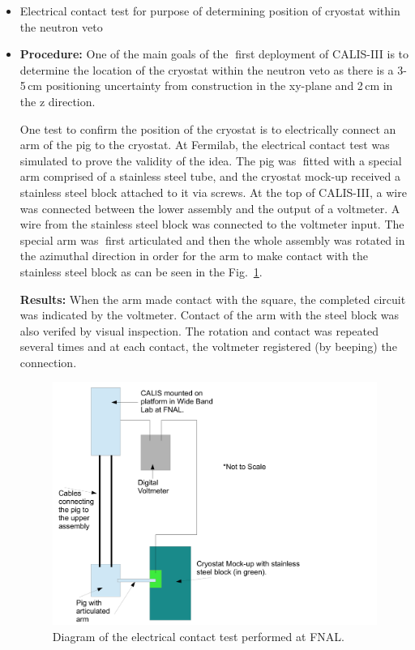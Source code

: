 \begin{itemize}
 \item{Electrical contact test for purpose of determining position of cryostat within the neutron veto}
  
\item{\bf Procedure:} One of the main goals of the first deployment of CALIS-III is to determine the location of the cryostat within the neutron veto as there is a 3-5\,cm positioning uncertainty from construction in the xy-plane and 2\,cm in the z direction.

One test to confirm the position of the cryostat is to electrically connect an arm of the pig to the cryostat. At Fermilab, the electrical contact test was simulated to prove the validity of the idea. The pig was fitted
with a special arm comprised of a stainless steel tube, and the cryostat mock-up received a stainless steel
block attached to it via screws. At the top of CALIS-III, a wire was connected between the lower assembly
and the output of a voltmeter. A wire from the stainless steel block was connected to the voltmeter input. The special arm was first articulated and then the whole assembly was rotated in the azimuthal direction in
order for the arm to make contact with the stainless steel block as can be seen in the Fig.~\ref{fig:electricalContact}.

{\bf Results:} When the arm made contact with the square, the completed circuit was indicated by the
voltmeter. Contact of the arm with the steel block was also verifed by visual inspection. The rotation and
contact was repeated several times and at each contact, the voltmeter registered (by beeping) the connection.

\begin{figure}[htbp]
 \centering
 \includegraphics[width=7in]{Figures/electricalContact_FNALtest_diagram}
 \caption{Diagram of the electrical contact test performed at FNAL.}
 \label{fig:electricalContact}
\end{figure}


\end{itemize}
